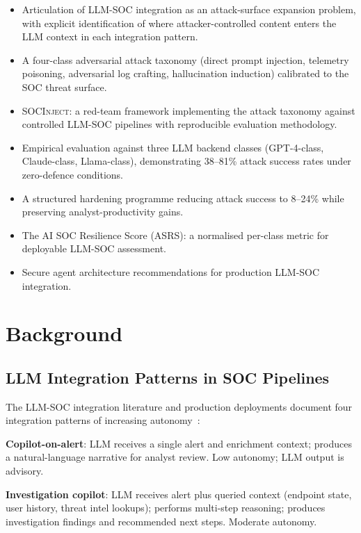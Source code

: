 \documentclass[sigconf,nonacm]{acmart}
\begin{document}
\begin{itemize}
  \item Articulation of LLM-SOC integration as an attack-surface
        expansion problem, with explicit identification of where
        attacker-controlled content enters the LLM context in each
        integration pattern.
  \item A four-class adversarial attack taxonomy (direct prompt
        injection, telemetry poisoning, adversarial log crafting,
        hallucination induction) calibrated to the SOC threat
        surface.
  \item \textsc{SOCInject}: a red-team framework implementing
        the attack taxonomy against controlled LLM-SOC pipelines
        with reproducible evaluation methodology.
  \item Empirical evaluation against three LLM backend classes
        (GPT-4-class, Claude-class, Llama-class), demonstrating
        38--81\% attack success rates under zero-defence conditions.
  \item A structured hardening programme reducing attack success
        to 8--24\% while preserving analyst-productivity gains.
  \item The AI SOC Resilience Score (ASRS): a normalised per-class
        metric for deployable LLM-SOC assessment.
  \item Secure agent architecture recommendations for
        production LLM-SOC integration.
\end{itemize}

\section{Background}

\subsection{LLM Integration Patterns in SOC Pipelines}

The LLM-SOC integration literature and production deployments
document four integration patterns of increasing
autonomy~\cite{soc2024llmsurvey,hassan2024aisoc,
veerasamy2024socai}:

\textbf{Copilot-on-alert}: LLM receives a single alert and
enrichment context; produces a natural-language narrative for
analyst review. Low autonomy; LLM output is advisory.

\textbf{Investigation copilot}: LLM receives alert plus queried
context (endpoint state, user history, threat intel lookups);
performs multi-step reasoning; produces investigation findings
and recommended next steps. Moderate autonomy.
\end{document}
